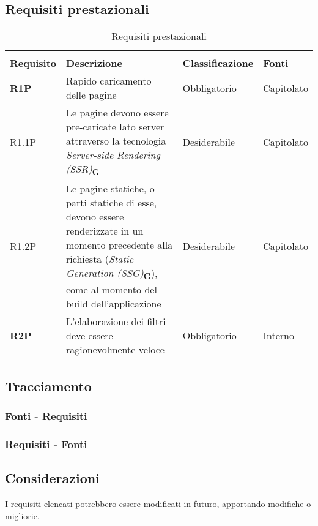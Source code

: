 \newpage
\subsection{Requisiti prestazionali}
\begin{center}
    \centering
    \renewcommand{\arraystretch}{1.8}
    \label{tab:RequisitiPrestazionali}
    \begin{longtable}[!h]{p{50px} p{200px} p{100px} p{50px}}
        \rowcolor{white}\caption{Requisiti prestazionali}\\
        \rowcolor{logo!70} \textbf{Requisito} & \textbf{Descrizione}                                                                                                                                                                                                       & \textbf{Classificazione} & \textbf{Fonti} \\
        \textbf{R1P}                          & Rapido caricamento delle pagine                                                                                                                                                                                            & Obbligatorio             & Capitolato     \\
        R1.1P                                 & Le pagine devono essere pre-caricate lato server attraverso la tecnologia \textit{Server-side Rendering (SSR)}\textsubscript{\textbf{G}}                                                                                   & Desiderabile             & Capitolato     \\
        R1.2P                                 & Le pagine statiche, o parti statiche di esse, devono essere renderizzate in un momento precedente alla richiesta (\textit{Static Generation (SSG)}\textsubscript{\textbf{G}}), come al momento del build dell'applicazione & Desiderabile             & Capitolato     \\
        \textbf{R2P}                          & L'elaborazione dei filtri deve essere ragionevolmente veloce                                                                                                                                                               & Obbligatorio             & Interno        \\
           \end{longtable}
\end{center}

\newpage
\subsection{Tracciamento}
\subsubsection{Fonti - Requisiti}


\newpage
\subsubsection{Requisiti - Fonti}


\subsection{Considerazioni}
I requisiti elencati potrebbero essere modificati in futuro, apportando modifiche o migliorie.
